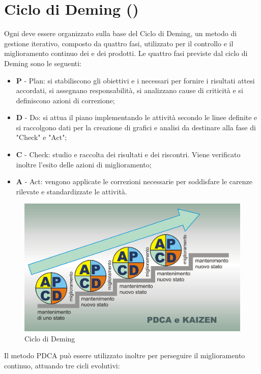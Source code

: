 \clearpage
\appendix
\section{Ciclo di Deming ()}
\label{sec:ciclo_deming}
Ogni  deve essere organizzato sulla base del Ciclo di Deming, un metodo di gestione iterativo, composto da quattro fasi, utilizzato per il controllo e il miglioramento continuo dei  e dei prodotti.
Le quattro fasi previste dal ciclo di Deming sono le seguenti:
\begin{itemize}
	\item \textbf{P} - Plan: si stabiliscono gli obiettivi e i  necessari per fornire i risultati attesi accordati, si assegnano responsabilità, si analizzano cause di criticità e si definiscono azioni di correzione;
	\item \textbf{D} - Do: si attua il piano implementando le attività secondo le linee definite e si raccolgono dati per la creazione di grafici e analisi da destinare alla fase di "Check" e "Act";
	\item \textbf{C} - Check: studio e raccolta dei risultati e dei riscontri. Viene verificato inoltre l'esito delle azioni di miglioramento;
	\item \textbf{A}  - Act: vengono applicate le correzioni necessarie per soddisfare le carenze rilevate e standardizzate le attività.
\end{itemize}
\begin{figure}[h]
	\includegraphics[width=1\textwidth]{../includes/pics/PDCAkaizen.png}
	\caption{Ciclo di Deming }
\end{figure}
Il metodo PDCA può essere utilizzato inoltre per perseguire il miglioramento continuo, attuando tre cicli evolutivi:
